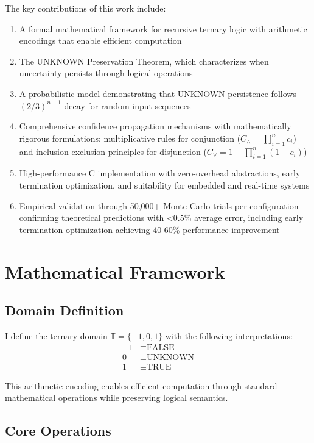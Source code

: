 \documentclass[11pt,a4paper]{article}
\begin{document}
The key contributions of this work include:

\begin{enumerate}
\item A formal mathematical framework for recursive ternary logic with arithmetic encodings that enable efficient computation
\item The UNKNOWN Preservation Theorem, which characterizes when uncertainty persists through logical operations
\item A probabilistic model demonstrating that UNKNOWN persistence follows $(2/3)^{n-1}$ decay for random input sequences
\item Comprehensive confidence propagation mechanisms with mathematically rigorous formulations: multiplicative rules for conjunction ($C_{\land} = \prod_{i=1}^n c_i$) and inclusion-exclusion principles for disjunction ($C_{\lor} = 1 - \prod_{i=1}^n (1 - c_i)$)
\item High-performance C implementation with zero-overhead abstractions, early termination optimization, and suitability for embedded and real-time systems
\item Empirical validation through 50,000+ Monte Carlo trials per configuration confirming theoretical predictions with <0.5\% average error, including early termination optimization achieving 40-60\% performance improvement
\end{enumerate}

\section{Mathematical Framework}

\subsection{Domain Definition}

I define the ternary domain $\mathbb{T} = \{-1, 0, 1\}$ with the following interpretations:
\begin{align}
-1 &\equiv \text{FALSE} \\
0 &\equiv \text{UNKNOWN} \\
1 &\equiv \text{TRUE}
\end{align}

This arithmetic encoding enables efficient computation through standard mathematical operations while preserving logical semantics.

\subsection{Core Operations}
\end{document}
